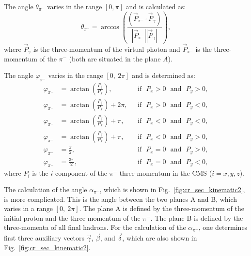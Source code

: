 The angle $\theta_{\pi^{-}}$ varies in the range $[0,\pi]$ and is calculated as:%
\begin{equation}
\theta_{\pi^{-}} = \arccos\left( \frac{(\vec P_{\pi^{-}} \cdot \vec P_{\gamma})}
{|\vec P_{\pi^{-}}| |\vec P_{\gamma}|} \right),
\label{angletheta}
\end{equation} 
where $\vec P_{\gamma}$ is the three-momentum of the virtual photon and $\vec P_{\pi^{-}}$ is the three-momentum of the  $\pi^{-}$ (both are situated in the plane $A$).

The angle $\varphi_{\pi^{-}}$ varies in the range $[0,~2\pi]$ and is determined as:
\begin{equation}
\begin{aligned}
\varphi_{\pi^{-}} &= \arctan\left( \frac{P_{y}}{P_{x}} \right), &\text{~~if~~} P_{x} > 0 \text{~~and~~}  P_{y} > 0, \\
\varphi_{\pi^{-}} &= \arctan\left( \frac{P_{y}}{P_{x}} \right) + 2\pi, &\text{~~if~~}P_{x} > 0 \text{~~and~~}  P_{y} < 0, \\
\varphi_{\pi^{-}} &= \arctan\left( \frac{P_{y}}{P_{x}} \right) + \pi, &\text{~~if~~}P_{x} < 0 \text{~~and~~}  P_{y} < 0, \\
\varphi_{\pi^{-}} &= \arctan\left( \frac{P_{y}}{P_{x}} \right) + \pi, &\text{~~if~~}P_{x} < 0 \text{~~and~~}  P_{y} > 0,  \\
\varphi_{\pi^{-}} &= \frac{\pi}{2}, &\text{~~if~~}P_{x} = 0 \text{~~and~~}  P_{y} > 0,  \\
\varphi_{\pi^{-}} &= \frac{3\pi}{2}, &\text{~~if~~}P_{x} = 0\text{~~and~~}  P_{y} < 0, 
\end{aligned}
\end{equation}
where $P_{i}$ is the $i$-component of the $\pi^{-}$ three-momentum in the CMS ($i = x,y,z$).

The calculation of the angle $\alpha_{\pi^{-}}$, which is shown in Fig.~\ref{fig:cr_sec_kinematic2}, is more complicated. This is the angle between the two planes A and B, which varies in a range $[0,~2\pi]$. The plane A is defined by the three-momentum of the initial proton and the three-momentum of the $\pi^{-}$. The plane B is defined by the three-momenta of all final hadrons. For the calculation of the $\alpha_{\pi^{-}}$, one determines first three auxiliary vectors $\vec \gamma$, $\vec \beta$, and $\vec \delta$, which are also shown in Fig.~\ref{fig:cr_sec_kinematic2}.

